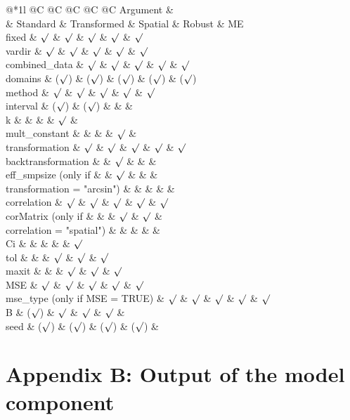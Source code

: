 @*1l @C @C @C @C @C Argument \&\\
\& Standard \& Transformed \& Spatial \& Robust \& ME\\
fixed \& \(\surd\) \& \(\surd\) \& \(\surd\) \& \(\surd\) \& \(\surd\)\\
vardir \& \(\surd\) \& \(\surd\) \& \(\surd\) \& \(\surd\) \& \(\surd\)\\
combined\_data \& \(\surd\) \& \(\surd\) \& \(\surd\) \& \(\surd\) \& \(\surd\)\\
domains \& (\(\surd\)) \& (\(\surd\)) \& (\(\surd\)) \& (\(\surd\)) \& (\(\surd\))\\
method \& \(\surd\) \& \(\surd\) \& \(\surd\) \& \(\surd\) \& \(\surd\)\\
interval \& (\(\surd\)) \& (\(\surd\)) \& \& \&\\
k \& \& \& \& \(\surd\) \&\\
mult\_constant \& \& \& \& \(\surd\) \&\\
transformation \& \(\surd\) \& \(\surd\) \& \(\surd\) \& \(\surd\) \& \(\surd\)\\
backtransformation \& \& \(\surd\) \& \& \&\\
eff\_smpsize (only if \& \& \(\surd\) \& \& \&\\
transformation = "arcsin") \& \& \& \& \&\\
correlation \& \(\surd\) \& \(\surd\) \& \(\surd\) \& \(\surd\) \& \(\surd\)\\
corMatrix (only if \& \& \& \(\surd\) \& \(\surd\) \&\\
correlation = "spatial") \& \& \& \& \&\\
Ci \& \& \& \& \& \(\surd\)\\
tol \& \& \& \(\surd\) \& \(\surd\) \& \(\surd\)\\
maxit \& \& \& \(\surd\) \& \(\surd\) \& \(\surd\)\\
MSE \& \(\surd\) \& \(\surd\) \& \(\surd\) \& \(\surd\) \& \(\surd\)\\
mse\_type (only if MSE = TRUE) \& \(\surd\) \& \(\surd\) \& \(\surd\) \& \(\surd\) \&
\(\surd\)\\
B \& (\(\surd\)) \& \(\surd\) \& \(\surd\) \& \(\surd\) \&\\
seed \& (\(\surd\)) \& (\(\surd\)) \& (\(\surd\)) \& (\(\surd\)) \&\\

\hypertarget{sec:AppendixB}{%
\section{Appendix B: Output of the model component}\label{sec:AppendixB}}


